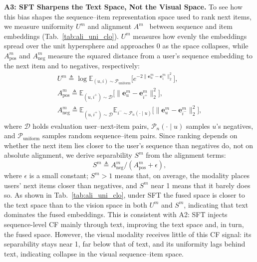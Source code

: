 \vspace{+0.1cm}
\noindent\textbf{A3: SFT Sharpens the Text Space, Not the Visual Space.}
To see how this bias shapes the sequence--item representation space used to rank next items, we measure uniformity $U^m$ and alignment $A^m$~\cite{align} between sequence and item embeddings (Tab.~\ref{tab:ali_uni_clo}).
$U^m$ measures how evenly the embeddings spread over the unit hypersphere and approaches 0 as the space collapses, while $A^m_{\text{pos}}$ and $A^m_{\text{neg}}$ measure the squared distance from a user's sequence embedding to the next item and to negatives, respectively:
\begin{equation}
\begin{gathered}
U^{m}
\triangleq
\log
\mathbb{E}_{(u,i)\sim \mathcal{P}_{\text{uniform}}}
\Big[e^{-2\|\mathbf{e}_u^m-\mathbf{e}_i^m\|_2^2}\Big],\\
A_{\text{pos}}^{m} \triangleq
\mathbb{E}_{(u,i^+)\sim \mathcal{D}}
\Big[\|\mathbf{e}_u^m-\mathbf{e}_{i^+}^m\|_2^2\Big],\\
A_{\text{neg}}^{m}
\triangleq
\mathbb{E}_{(u,i^+)\sim \mathcal{D}}
\mathbb{E}_{i^- \sim \mathcal{P}_n(\cdot \mid u)}
\Big[\|\mathbf{e}_u^m-\mathbf{e}_{i^-}^m\|_2^2\Big],
\end{gathered}
\end{equation}
where $\mathcal{D}$ holds evaluation user--next-item pairs, $\mathcal{P}_n(\cdot\mid u)$ samples $u$'s negatives, and $\mathcal{P}_{\text{uniform}}$ samples random sequence--item pairs.
Since ranking depends on whether the next item lies closer to the user's sequence than negatives do, not on absolute alignment, we derive separability $S^m$ from the alignment terms:
\begin{equation}
S^m \triangleq A^m_{\text{neg}} / (A^m_{\text{pos}} + \epsilon),
\end{equation}
where $\epsilon$ is a small constant; $S^m>1$ means that, on average, the modality places users' next items closer than negatives, and $S^m$ near 1 means that it barely does so.
As shown in Tab.~\ref{tab:ali_uni_clo}, under SFT the fused space is closer to the text space than to the vision space in both $U^m$ and $S^m$, indicating that text dominates the fused embeddings.
This is consistent with A2: SFT injects sequence-level CF mainly through text, improving the text space and, in turn, the fused space.
However, the visual modality receives little of this CF signal: its separability stays near 1, far below that of text, and its uniformity lags behind text, indicating collapse in the visual sequence--item space.

